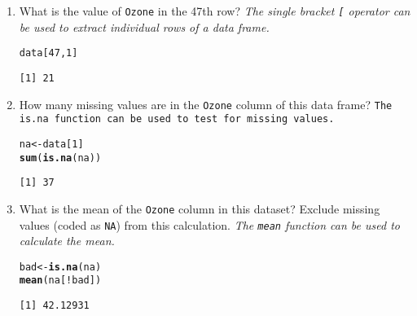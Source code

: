 \documentclass{article}\usepackage[]{graphicx}\usepackage[]{color}
\makeatletter
\newcommand{\hlnum}[1]{\textcolor[rgb]{0.686,0.059,0.569}{#1}}%
\newcommand{\hlopt}[1]{\textcolor[rgb]{0,0,0}{#1}}%
\newcommand{\hlstd}[1]{\textcolor[rgb]{0.345,0.345,0.345}{#1}}%
\newcommand{\hlkwb}[1]{\textcolor[rgb]{0.69,0.353,0.396}{#1}}%
\newcommand{\hlkwd}[1]{\textcolor[rgb]{0.737,0.353,0.396}{\textbf{#1}}}%
\newenvironment{kframe}{%
 \def\at@end@of@kframe{}%
 \ifinner\ifhmode%
  \def\at@end@of@kframe{\end{minipage}}%
  \begin{minipage}{\columnwidth}%
 \fi\fi%
 \def\FrameCommand##1{\hskip\@totalleftmargin \hskip-\fboxsep
 \colorbox{shadecolor}{##1}\hskip-\fboxsep
     \hskip-\linewidth \hskip-\@totalleftmargin \hskip\columnwidth}%
 \MakeFramed {\advance\hsize-\width
   \@totalleftmargin\z@ \linewidth\hsize
   \@setminipage}}%
 {\par\unskip\endMakeFramed%
 \at@end@of@kframe}
\newenvironment{knitrout}{}{} %
\makeatother
\begin{document}
\begin{enumerate}
  \item What is the value of \texttt{Ozone} in the 47th row?
  \emph{The single bracket \texttt{[} operator can be used to extract individual rows of a data frame.}
\begin{knitrout}
\color{fgcolor}\begin{kframe}
\begin{alltt}
\hlstd{data[}\hlnum{47}\hlstd{,} \hlnum{1}\hlstd{]}
\end{alltt}
\begin{verbatim}
[1] 21
\end{verbatim}
\end{kframe}
\end{knitrout}

  \item How many missing values are in the \texttt{Ozone} column of this data frame?
  \texttt{The \texttt{is.na} function can be used to test for missing values.}
\begin{knitrout}
\color{fgcolor}\begin{kframe}
\begin{alltt}
\hlstd{na} \hlkwb{<-} \hlstd{data [}\hlnum{1}\hlstd{]}
\hlkwd{sum}\hlstd{(}\hlkwd{is.na}\hlstd{(na))}
\end{alltt}
\begin{verbatim}
[1] 37
\end{verbatim}
\end{kframe}
\end{knitrout}
  
  \item What is the mean of the \texttt{Ozone} column in this dataset? Exclude missing values (coded as \texttt{NA}) from this calculation.
  \emph{The \texttt{mean} function can be used to calculate the mean.}
\begin{knitrout}
\color{fgcolor}\begin{kframe}
\begin{alltt}
\hlstd{bad} \hlkwb{<-} \hlkwd{is.na}\hlstd{(na)}
\hlkwd{mean}\hlstd{(na[}\hlopt{!}\hlstd{bad])}
\end{alltt}
\begin{verbatim}
[1] 42.12931
\end{verbatim}
\end{kframe}
\end{knitrout}
  

\end{enumerate}
\end{document}
